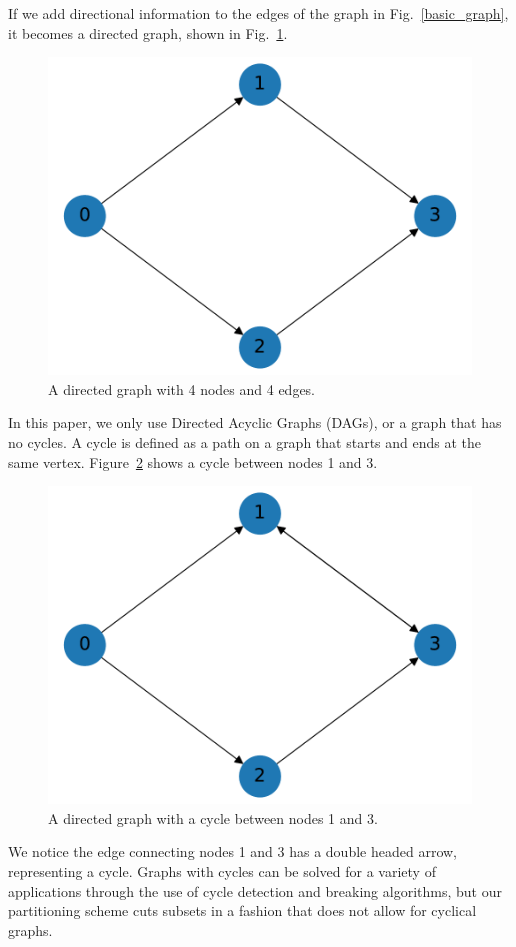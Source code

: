 \documentclass[times,final]{elsarticle}
\begin{document}
If we add directional information to the edges of the graph in Fig.~\ref{basic_graph}, it becomes a directed graph, shown in Fig.~\ref{directed_graph}.
\begin{figure}[H]
\centering
\includegraphics[scale=0.5]{../figures/directed_graph.pdf}
\caption{A directed graph with 4 nodes and 4 edges. }
\label{directed_graph}
\end{figure}
In this paper, we only use Directed Acyclic Graphs (DAGs), or a graph that has no cycles.  A cycle is defined as a path on a graph that starts and ends at the same vertex. Figure~\ref{cycle_example} shows a cycle between nodes 1 and 3.
\begin{figure}[H]
\centering
\includegraphics[scale=0.5]{../figures/cycle_example.pdf}
\caption{A directed graph with a cycle between nodes 1 and 3.}
\label{cycle_example}
\end{figure}
We notice the edge connecting nodes 1 and 3 has a double headed arrow, representing a cycle.
Graphs with cycles can be solved for a variety of applications through the use of cycle detection and breaking algorithms, but our partitioning scheme cuts subsets in a fashion that does not allow for cyclical graphs.
\end{document}
